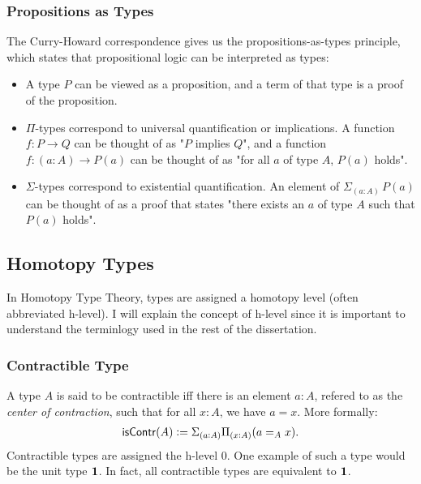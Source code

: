 \subsubsection{Propositions as Types}
The Curry-Howard correspondence gives us the propositions-as-types
principle, which states that propositional logic can be interpreted
as types:
\begin{itemize}
    \item A type $P$ can be viewed as a proposition, and a term of that
    type is a proof of the proposition.
    \item $\Pi$-types correspond to universal quantification or implications.
    A function $f : P \to Q$ can be thought of as "$P$ implies $Q$", and
    a function $f : (a : A) \to P(a)$ can be thought of as "for all $a$
    of type $A$, $P(a)$ holds".
    \item $\Sigma$-types correspond to existential quantification.
    An element of $\Sigma_(a : A)\,P(a)$ can be thought of as a proof
    that states "there exists an $a$ of type $A$ such that $P(a)$ holds".
\end{itemize}

\subsection{Homotopy Types}
In Homotopy Type Theory, types are assigned a homotopy level
(often abbreviated h-level). I will explain the concept of h-level
since it is important to understand the terminlogy used in the rest
of the dissertation.
\subsubsection{Contractible Type}
A type $A$ is said to be contractible iff there is an element
$a : A$, refered to as the \emph{center of contraction}, such that
for all $x: A$, we have $a = x$. More formally:
\begin{align*}
    \operatorname{\mathsf{isContr}}(A) := \Sigma_{(a : A)}\Pi_{(x : A)}(a =_A x).
\end{align*}
Contractible types are assigned the h-level 0.
One example of such a type would be the unit type ${\mathbf{1}}$.
In fact, all contractible types are equivalent to ${\mathbf{1}}$.
